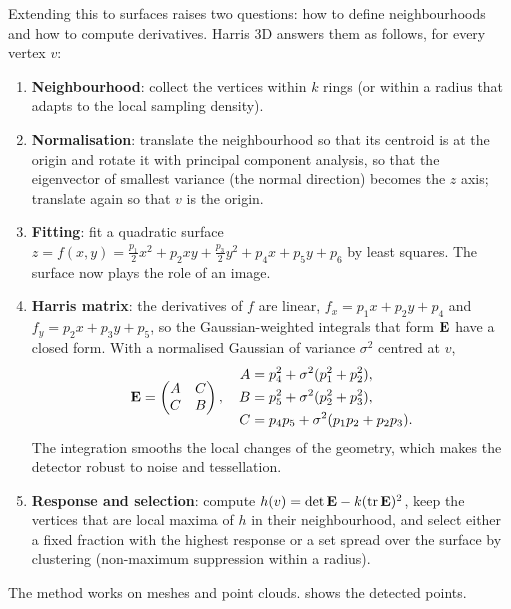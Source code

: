 Extending this to surfaces raises two questions: how to define neighbourhoods and how to compute
derivatives. Harris 3D \citep{Sipiran2011} answers them as follows, for every vertex $v$:
\begin{enumerate}
  \item \textbf{Neighbourhood}: collect the vertices within $k$ rings (or within a radius that
  adapts to the local sampling density).
  \item \textbf{Normalisation}: translate the neighbourhood so that its centroid is at the origin and
  rotate it with principal component analysis, so that the eigenvector of smallest variance (the
  normal direction) becomes the $z$ axis; translate again so that $v$ is the origin.
  \item \textbf{Fitting}: fit a quadratic surface
  $z=f(x,y)=\tfrac{p_1}{2}x^2+p_2xy+\tfrac{p_3}{2}y^2+p_4x+p_5y+p_6$ by least squares. The surface
  now plays the role of an image.
  \item \textbf{Harris matrix}: the derivatives of $f$ are linear,
  $f_x=p_1x+p_2y+p_4$ and $f_y=p_2x+p_3y+p_5$, so the Gaussian-weighted integrals that form $\mathbf{E}$
  have a closed form. With a normalised Gaussian of variance $\sigma^2$ centred at $v$,
  \begin{equation}
  \mathbf{E}=\begin{pmatrix}A&C\\C&B\end{pmatrix},\quad
  \begin{aligned}
  A&=p_4^2+\sigma^2(p_1^2+p_2^2),\\ B&=p_5^2+\sigma^2(p_2^2+p_3^2),\\ C&=p_4p_5+\sigma^2(p_1p_2+p_2p_3).
  \end{aligned}
  \end{equation}
  The integration smooths the local changes of the geometry, which makes the detector robust to
  noise and tessellation.
  \item \textbf{Response and selection}: compute $h(v)=\det\mathbf{E}-k(\operatorname{tr}\mathbf{E})^2$, keep the vertices that
  are local maxima of $h$ in their neighbourhood, and select either a fixed fraction with the
  highest response or a set spread over the surface by clustering (non-maximum suppression within a
  radius).
\end{enumerate}
The method works on meshes and point clouds.  shows the detected points.


